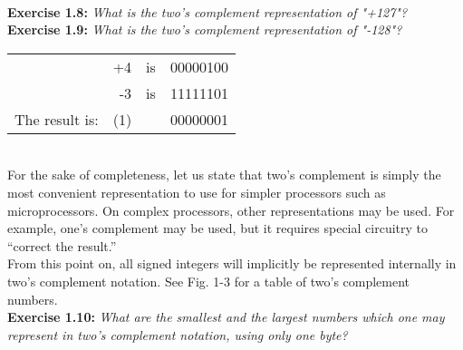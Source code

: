 \documentclass[12pt]{book}
\begin{document}
\\

\noindent\textbf{Exercise 1.8:} \textit{What is the two's complement representation of "+127"?}\\

\noindent\textbf{Exercise 1.9:} \textit{What is the two's complement representation of "-128"?}\\

\begin{table}[H]
\begin{tabular}{lrcr}
               & +4  & is & 00000100 \\
               & -3  & is & 11111101 \\ \cline{2-4} 
The result is: & (1) &    & 00000001
\end{tabular}
\end{table}
\\

For the sake of completeness, let us state that two's complement is simply the most convenient representation to use for simpler processors such as microprocessors. On complex processors, other representations may be used. For example, one's complement may be used, but it requires special circuitry to “correct the result.”\\

From this point on, all signed integers will implicitly be represented internally in two's complement notation. See Fig. 1-3 for a table of two's complement numbers.\\

\noindent\textbf{Exercise 1.10:} \textit{What are the smallest and the largest numbers which one may represent in two's complement notation, using only one byte?}\\
\end{document}
